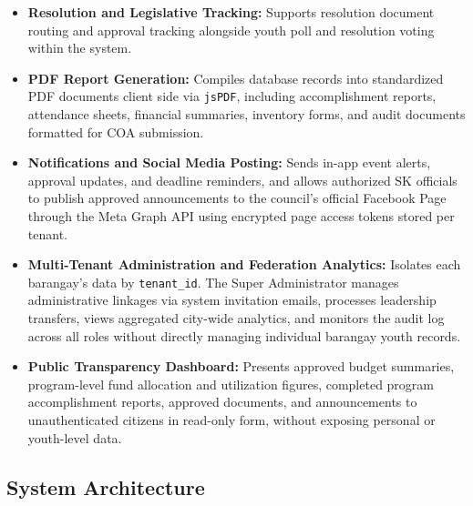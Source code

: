 \begin{itemize}
    \item \textbf{Resolution and Legislative Tracking:} Supports resolution document routing and approval tracking alongside youth poll and resolution voting within the system.
    \item \textbf{PDF Report Generation:} Compiles database records into standardized PDF documents client side via \texttt{jsPDF}, including accomplishment reports, attendance sheets, financial summaries, inventory forms, and audit documents formatted for COA submission.
    \item \textbf{Notifications and Social Media Posting:} Sends in-app event alerts, approval updates, and deadline reminders, and allows authorized SK officials to publish approved announcements to the council's official Facebook Page through the Meta Graph API using encrypted page access tokens stored per tenant.
    \item \textbf{Multi-Tenant Administration and Federation Analytics:} Isolates each barangay's data by \texttt{tenant\_id}. The Super Administrator manages administrative linkages via system invitation emails, processes leadership transfers, views aggregated city-wide analytics, and monitors the audit log across all roles without directly managing individual barangay youth records.
    \item \textbf{Public Transparency Dashboard:} Presents approved budget summaries, program-level fund allocation and utilization figures, completed program accomplishment reports, approved documents, and announcements to unauthenticated citizens in read-only form, without exposing personal or youth-level data.
\end{itemize}
\vspace{5mm}

\subsection{System Architecture}
\label{subsec:system_architecture}

